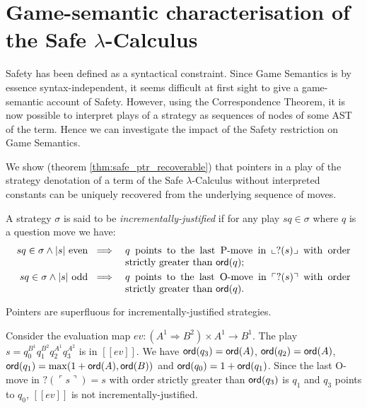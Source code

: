\documentclass{llncs}
\newcommand\ord[1]{{\sf ord}(#1)}
\newcommand{\sem}[1]{{[\![ #1 ]\!]}}
\newcommand{\oview}[1]{\llcorner #1 \lrcorner}
\newcommand{\pview}[1]{\ulcorner #1 \urcorner}
\begin{document}
\section{Game-semantic characterisation of the Safe $\lambda$-Calculus}

Safety has been defined as a syntactical constraint. Since Game
Semantics is by essence syntax-independent, it seems difficult at
first sight to give a game-semantic account of Safety.
However, using the Correspondence Theorem, it is now possible to interpret plays
of a strategy as sequences of nodes of some AST of the term. Hence we can investigate the impact of the Safety restriction on Game Semantics.

We show (theorem \ref{thm:safe_ptr_recoverable}) that pointers in a play of
the strategy denotation of a term of the Safe $\lambda$-Calculus without interpreted
constants can be uniquely recovered from the underlying sequence of moves.

\begin{definition}
A strategy $\sigma$ is said to be \emph{incrementally-justified}
if for any play $s q \in \sigma$ where $q$ is a question
move we have:
\begin{eqnarray*}
s q \in \sigma \wedge |s| \mbox{ even } &\implies& \parbox[t]{8cm}{$q$ points to the last P-move in $\oview{?(s)}$ with order strictly greater than $\ord{q}$;} \\
s q \in \sigma \wedge |s| \mbox{ odd } &\implies&
\parbox[t]{8cm}{$q$  points to the last O-move in $\pview{?(s)}$
with order strictly greater than $\ord{q}$.}
\end{eqnarray*}
\end{definition}

\begin{lemma}
\label{lem:incrjustified_pointers_uniqu_recover} Pointers are
superfluous for incrementally-justified strategies.
\end{lemma}

\begin{example}
Consider the evaluation map $ev : (A^1 \Rightarrow B^2) \times  A^1 \rightarrow B^1$.
The play $s = q_0^{B^1} q_1^{B^2} q_2^{A^1} q_3^{A^2}$ is in $\sem{ev}$. We have $\ord{q_3} = \ord{A}$,
$\ord{q_2} = \ord{A}$, $\ord{q_1} = \max( 1+\ord{A}, \ord{B})$ and
$\ord{q_0} = 1 + \ord{q_1}$. Since the last O-move in $?(\pview{s})= s$
with order strictly greater than $\ord{q_3}$ is $q_1$ and $q_3$ points to $q_0$, $\sem{ev}$ is not incrementally-justified.
\end{example}
\end{document}
